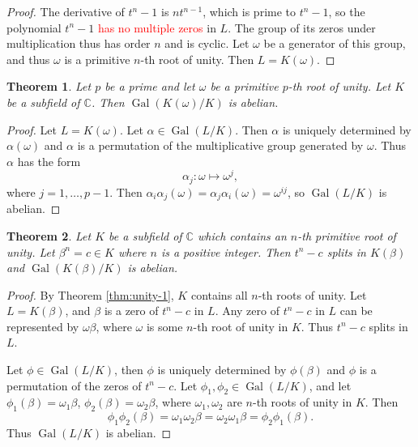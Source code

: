\documentclass[12pt]{article}
\newtheorem{theorem}{Theorem}
\newcommand{\Gal}{\operatorname{Gal}}
\begin{document}
\begin{proof}
The derivative of $t^n-1$ is $n t^{n-1}$, which is prime to $t^n-1$, so the polynomial $t^n-1$ \textcolor{red}{has no multiple zeros} in $L$. The group of its zeros under multiplication thus has order $n$ and is cyclic. Let $\omega$ be a generator of this group, and thus $\omega$ is a primitive $n$-th root of unity. Then $L=K(\omega)$. 
\end{proof}


\begin{theorem} \label{thm:radical-1}
    Let $p$ be a prime and let $\omega$ be a primitive $p$-th root of unity. Let $K$ be a subfield of $\mathbb C$. Then $\Gal(K(\omega) / K)$ is abelian.
\end{theorem}
\begin{proof}
Let $L = K(\omega)$.  Let $\alpha \in \Gal(L / K)$. Then $\alpha$ is uniquely determined by $\alpha(\omega)$ and $\alpha$ is a permutation of the multiplicative group generated by $\omega$. Thus $\alpha$ has the form
$$
\alpha_j: \omega \mapsto \omega^j,
$$
where $j=1,\dots,p-1$. Then $\alpha_i \alpha_j (\omega) = \alpha_j \alpha_i (\omega) = \omega^{i j}$, so $ \Gal(L / K)$ is abelian.
\end{proof}

\begin{theorem} \label{thm:radical-2}
    Let $K$ be a subfield of $\mathbb{C}$ which contains an $n$-th primitive root of unity. Let $\beta^n = c \in K $ where $n$ is a positive integer. Then $t^n - c$ splits in $K(\beta)$ and $\Gal(K(\beta) / K)$ is abelian.
\end{theorem}

\begin{proof}
By Theorem \ref{thm:unity-1}, $K$ contains all $n$-th roots of unity. Let $L = K(\beta)$, and $\beta$ is a zero of $t^n-c$ in $L$. Any zero of $t^n-c$ in $L$ can be represented by $\omega \beta$, where $\omega$ is some $n$-th root of unity in $K$. Thus $t^n - c$ splits in $L$.  

Let $\phi \in \Gal(L / K)$, then $\phi$ is uniquely determined by $\phi(\beta)$ and $\phi$ is a permutation of the zeros of $t^n - c$. Let $\phi_1, \phi_2 \in \Gal(L / K)$, and let $\phi_1(\beta) = \omega_1\beta$, $\phi_2(\beta) = \omega_2\beta$, where $\omega_1, \omega_2$ are $n$-th roots of unity in $K$. Then
$$
\phi_1 \phi_2(\beta)=\omega_1 \omega_2 \beta=\omega_2 \omega_1  \beta=\phi_2 \phi_1(\beta).
$$
Thus $\Gal(L / K)$ is abelian.
\end{proof}
\end{document}
